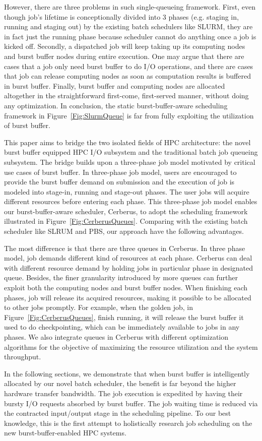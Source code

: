 However, there are three problems in such single-queueing framework.
First, even though job's lifetime is conceptionally divided into 3 phases
(e.g. staging in, running and staging out) by the existing batch schedulers like SLURM,
they are in fact just the running phase because scheduler cannot do anything once a job is kicked off.
Secondly, a dispatched job will keep taking up its computing nodes and burst buffer nodes during entire execution.
One may argue that there are cases that a job only need burst buffer to do I/O operations,
and there are cases that job can release computing nodes as soon as computation results is buffered
in burst buffer.
Finally, burst buffer and computing nodes are allocated altogether
in the straightforward first-come, first-served manner, without doing any optimization.
In conclusion, the static burst-buffer-aware scheduling framework in Figure~\ref{Fig:SlurmQueue}
is far from fully exploiting the utilization of burst buffer.

This paper aims to bridge the two isolated fields of HPC architecture:
the novel burst buffer equipped HPC I/O subsystem and the
traditional batch job queueing subsystem.
The bridge builds upon a three-phase job model motivated by critical use cases of burst buffer.
In three-phase job model, users are encouraged to provide the burst buffer demand on submission
and the execution of job is modeled into stage-in, running and stage-out phases.
The user jobs will acquire different resources before entering each phase.
This three-phase job model enables our burst-buffer-aware scheduler, Cerberus,
to adopt the scheduling framework illustrated in Figure~\ref{Fig:CerberusQueues}.
Comparing with the existing batch scheduler like SLRUM and PBS,
our approach have the following advantages.

The most difference is that there are three queues in Cerberus.
In three phase model, job demands different kind of resources at each phase.
Cerberus can deal with different resource demand by holding jobs in particular phase in designated queue.
Besides, the finer granularity introduced by more queues can further exploit
both the computing nodes and burst buffer nodes.
When finishing each phases, job will release its acquired resources, making it possible
to be allocated to other jobs promptly.
For example, when the golden job, in Figure~\ref{Fig:CerberusQueues}, finish running, it will release the burst buffer it used to
do checkpointing, which can be immediately available to jobs in any phases.
We also integrate queues in Cerberus with different optimization algorithms for the
objective of maximizing the resource utilization and the system throughput.

In the following sections, we demonstrate that when burst buffer is intelligently allocated
by our novel batch scheduler, the benefit is far beyond the higher hardware transfer bandwidth.
The job execution is expedited by having their bursty I/O requests absorbed by burst buffer.
The job waiting time is reduced via the contracted input/output stage in the scheduling pipeline.
To our best knowledge, this is the first attempt to holistically research job scheduling
on the new burst-buffer-enabled HPC systems.

